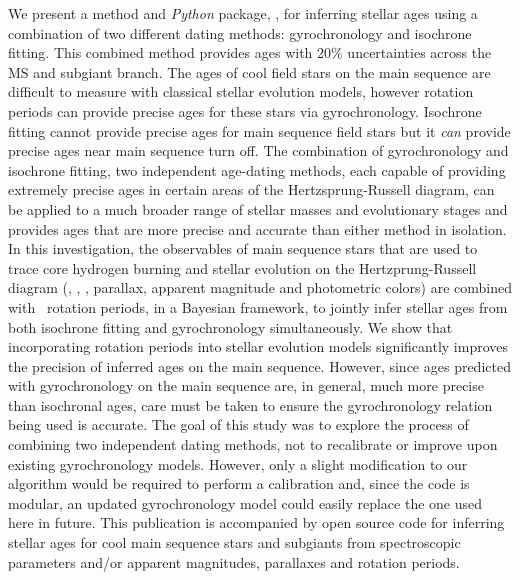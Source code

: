 We present a method and {\it Python} package, \sd, for inferring stellar ages
using a combination of two different dating methods: gyrochronology and
isochrone fitting.
This combined method provides ages with 20\% uncertainties across the MS and
subgiant branch.
The ages of cool field stars on the main sequence are difficult to measure
with classical stellar evolution models, however rotation periods can provide
precise ages for these stars via gyrochronology.
Isochrone fitting cannot provide precise ages for main sequence field stars
but it {\it can} provide precise ages near main sequence turn off.
The combination of gyrochronology and isochrone fitting, two independent
age-dating methods, each capable of providing extremely precise ages in
certain areas of the Hertzsprung-Russell diagram, can be applied to a much
broader range of stellar masses and evolutionary stages and provides ages that
are more precise and accurate than either method in isolation.
In this investigation, the observables of main sequence stars that are used to
trace core hydrogen burning and stellar evolution on the Hertzprung-Russell
diagram (\teff, \feh, \logg, parallax, apparent magnitude and photometric
colors) are combined with \kepler\ rotation periods, in a Bayesian framework,
to jointly infer stellar ages from both isochrone fitting and gyrochronology
simultaneously.
We show that incorporating rotation periods into stellar evolution models
significantly improves the precision of inferred ages on the main sequence.
However, since ages predicted with gyrochronology on the main sequence are, in
general, much more precise than isochronal ages, care must be taken to ensure
the gyrochronology relation being used is accurate.
The goal of this study was to explore the process of combining two independent
dating methods, not to recalibrate or improve upon existing gyrochronology
models.
However, only a slight modification to our algorithm would be required to
perform a calibration and, since the code is modular, an updated
gyrochronology model could easily replace the one used here in future.
This publication is accompanied by open source code for inferring stellar ages
for cool main sequence stars and subgiants from spectroscopic parameters
and/or apparent magnitudes, parallaxes and rotation periods.
